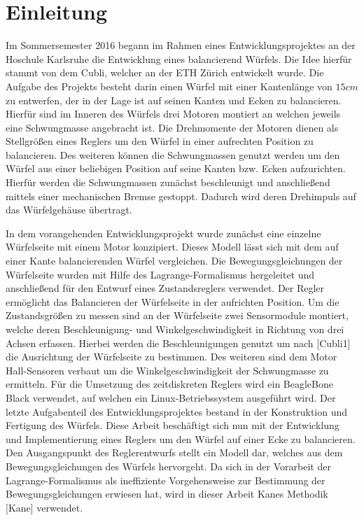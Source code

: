 \chapter{Einleitung}
Im Sommersemester 2016 begann im Rahmen eines Entwicklungsprojektes an der Hoschule Karlsruhe die Entwicklung eines balancierend Würfels. Die Idee hierfür stammt von dem Cubli, welcher an der ETH Zürich entwickelt wurde. Die Aufgabe des Projekts besteht darin einen Würfel mit einer Kantenlänge von $15cm$ zu entwerfen, der in der Lage ist auf seinen Kanten und Ecken zu balancieren. Hierfür sind im Inneren des Würfels drei Motoren montiert an welchen jeweils eine Schwungmasse angebracht ist. Die Drehmomente der Motoren dienen als Stellgrößen eines Reglers um den Würfel in einer aufrechten Position zu balancieren. Des weiteren können die Schwungmassen genutzt werden um den Würfel aus einer beliebigen Position auf seine Kanten bzw. Ecken aufzurichten. Hierfür werden die Schwungmassen zunächst beschleunigt und anschließend mittels einer mechanischen Bremse gestoppt. Dadurch wird deren Drehimpuls auf das Würfelgehäuse übertragt.

In dem vorangehenden Entwicklungsprojekt wurde zunächst eine einzelne Würfelseite mit einem Motor konzipiert. Dieses Modell lässt sich mit dem auf einer Kante balancierenden Würfel vergleichen. Die Bewegungsgleichungen der Würfelseite wurden mit Hilfe des Lagrange-Formalismus hergeleitet und anschließend für den Entwurf eines Zustandsreglers verwendet. Der Regler ermöglicht das Balancieren der Würfelseite in der aufrichten Position. Um die Zustandsgrößen zu messen sind an der Würfelseite zwei Sensormodule montiert, welche deren Beschleunigung- und Winkelgeschwindigkeit in Richtung von drei Achsen erfassen. Hierbei werden die Beschleunigungen genutzt um nach [Cubli1] die Ausrichtung der Würfelseite zu bestimmen. Des weiteren sind dem Motor Hall-Sensoren verbaut um die Winkelgeschwindigkeit der Schwungmasse zu ermitteln. Für die Umsetzung des zeitdiskreten Reglers wird ein BeagleBone Black verwendet, auf welchen ein Linux-Betriebssystem ausgeführt wird. Der letzte Aufgabenteil des Entwicklungsprojektes bestand in der Konstruktion und Fertigung des Würfels.
Diese Arbeit beschäftigt sich nun mit der Entwicklung und Implementierung eines Reglers um den Würfel auf einer Ecke zu balancieren. Den Ausgangspunkt des Reglerentwurfs stellt ein Modell dar, welches aus dem Bewegungsgleichungen des Würfels hervorgeht. Da sich in der Vorarbeit der Lagrange-Formalismus als ineffiziente Vorgehensweise zur Bestimmung der Bewegungsgleichungen erwiesen hat, wird in dieser Arbeit Kanes Methodik [Kane] verwendet.

